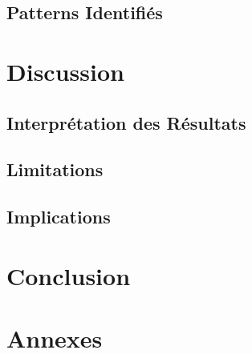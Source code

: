 \documentclass[12pt,a4paper]{article}
\begin{document}
\subsection{Patterns Identifiés}

\section{Discussion}
\subsection{Interprétation des Résultats}
\subsection{Limitations}
\subsection{Implications}

\section{Conclusion}

\appendix
\section{Annexes}



\end{document}
